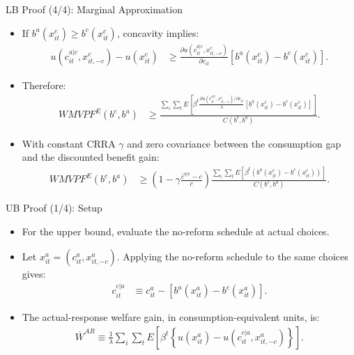 \begin{frame}[label=lbProofMU]{LB Proof (4/4): Marginal Approximation}
    \footnotesize
    \begin{itemize}
        \item If \(b^a(x^c_{it})\geq b^c(x^c_{it})\), concavity implies:
        \begin{align*}
            u(c^{a|c}_{it},x^c_{it,-c})-u(x^c_{it})
            &\ge
            \frac{\partial u(c^{a|c}_{it},x^c_{it,-c})}{\partial c_{it}}
            \left[b^a(x^c_{it})-b^c(x^c_{it})\right].
        \end{align*}
        \item Therefore:
        \begin{align*}
            WMVPF^E(b^c,b^a)
            &\ge
            \frac{\sum_i\sum_t E\left[
            \beta^t
            \frac{\partial u(c^{a|c}_{it},x^c_{it,-c})/\partial c_{it}}{\lambda}
            \left[b^a(x^c_{it})-b^c(x^c_{it})\right]
            \right]}{C(b^c,b^a)}.
        \end{align*}
        \item With constant CRRA \(\gamma\) and zero covariance between the consumption gap and the discounted benefit gain:
        \begin{align*}
            WMVPF^E(b^c,b^a)
            &\ge
            \left(1-\gamma\frac{\bar c^{a|c}-c}{c}\right)
            \frac{\sum_i\sum_t E\left[\beta^t\left(b^a(x^c_{it})-b^c(x^c_{it})\right)\right]}
            {C(b^c,b^a)}.
        \end{align*}
    \end{itemize}
\end{frame}

\begin{frame}[label=ubProofSetup]{UB Proof (1/4): Setup}
    \small
    \begin{itemize}
        \item For the upper bound, evaluate the no-reform schedule at actual choices.
        \item Let \(x^a_{it}=(c^a_{it},x^a_{it,-c})\). Applying the no-reform schedule to the same choices gives:
        \begin{align*}
            c^{c|a}_{it}
            &\equiv c^a_{it}-\left[b^a(x^a_{it})-b^c(x^a_{it})\right].
        \end{align*}
        \item The actual-response welfare gain, in consumption-equivalent units, is:
        \begin{align*}
            \overline W^{AR}
            \equiv
            \frac{1}{\lambda}\sum_i\sum_t E\left[
            \beta^t
            \left\{
            u(x^a_{it})
            -
            u(c^{c|a}_{it},x^a_{it,-c})
            \right\}
            \right].
        \end{align*}
    \end{itemize}
\end{frame}

